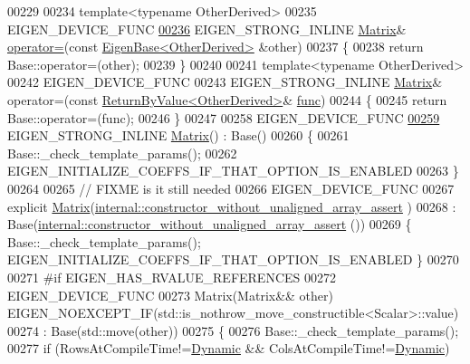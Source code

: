 \begin{DoxyCode}
00229 
00234     \textcolor{keyword}{template}<\textcolor{keyword}{typename} OtherDerived>
00235     EIGEN\_DEVICE\_FUNC
\hyperlink{group___core___module_ae1be4ae99dbfc91c6a3a0d0af7165047}{00236}     EIGEN\_STRONG\_INLINE \hyperlink{group___core___module_class_eigen_1_1_matrix}{Matrix}& \hyperlink{group___core___module_ae1be4ae99dbfc91c6a3a0d0af7165047}{operator=}(\textcolor{keyword}{const} 
      \hyperlink{group___core___module_struct_eigen_1_1_eigen_base}{EigenBase<OtherDerived>} &other)
00237     \{
00238       \textcolor{keywordflow}{return} Base::operator=(other);
00239     \}
00240 
00241     \textcolor{keyword}{template}<\textcolor{keyword}{typename} OtherDerived>
00242     EIGEN\_DEVICE\_FUNC
00243     EIGEN\_STRONG\_INLINE \hyperlink{group___core___module_class_eigen_1_1_matrix}{Matrix}& operator=(\textcolor{keyword}{const} 
      \hyperlink{group___core___module_class_eigen_1_1_return_by_value}{ReturnByValue<OtherDerived>}& \hyperlink{structfunc}{func})
00244     \{
00245       \textcolor{keywordflow}{return} Base::operator=(func);
00246     \}
00247 
00258     EIGEN\_DEVICE\_FUNC
\hyperlink{group___core___module_a11f852d66fa55b2aed12aa22da807a6b}{00259}     EIGEN\_STRONG\_INLINE \hyperlink{group___core___module_a11f852d66fa55b2aed12aa22da807a6b}{Matrix}() : Base()
00260     \{
00261       Base::\_check\_template\_params();
00262       EIGEN\_INITIALIZE\_COEFFS\_IF\_THAT\_OPTION\_IS\_ENABLED
00263     \}
00264 
00265     \textcolor{comment}{// FIXME is it still needed}
00266     EIGEN\_DEVICE\_FUNC
00267     \textcolor{keyword}{explicit} \hyperlink{group___core___module_class_eigen_1_1_matrix}{Matrix}(\hyperlink{struct_eigen_1_1internal_1_1constructor__without__unaligned__array__assert}{internal::constructor\_without\_unaligned\_array\_assert}
      )
00268       : Base(\hyperlink{struct_eigen_1_1internal_1_1constructor__without__unaligned__array__assert}{internal::constructor\_without\_unaligned\_array\_assert}
      ())
00269     \{ Base::\_check\_template\_params(); EIGEN\_INITIALIZE\_COEFFS\_IF\_THAT\_OPTION\_IS\_ENABLED \}
00270 
00271 \textcolor{preprocessor}{#if EIGEN\_HAS\_RVALUE\_REFERENCES}
00272     EIGEN\_DEVICE\_FUNC
00273     Matrix(Matrix&& other) EIGEN\_NOEXCEPT\_IF(std::is\_nothrow\_move\_constructible<Scalar>::value)
00274       : Base(std::move(other))
00275     \{
00276       Base::\_check\_template\_params();
00277       \textcolor{keywordflow}{if} (RowsAtCompileTime!=\hyperlink{namespace_eigen_ad81fa7195215a0ce30017dfac309f0b2}{Dynamic} && ColsAtCompileTime!=\hyperlink{namespace_eigen_ad81fa7195215a0ce30017dfac309f0b2}{Dynamic})

\end{DoxyCode}
